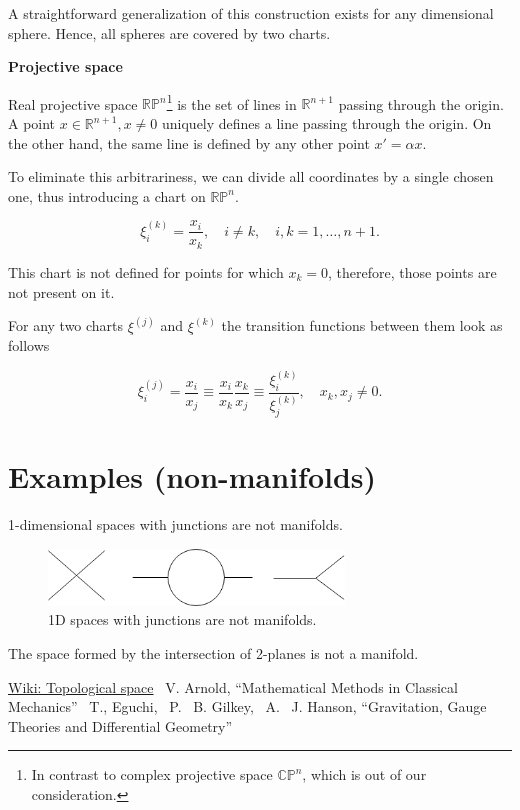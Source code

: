 \documentclass[a4paper,10pt]{article}
\begin{document}
A straightforward generalization of this construction exists for any dimensional sphere. Hence, all spheres are covered by two charts.
\newline

{\bf Projective space}
\newline

Real projective space $\mathbb{RP}^n$\footnote{ In contrast to complex projective space $\mathbb{CP}^n$, which is out of our consideration.  } is the set of lines in $\mathbb{R}^{n+1}$ passing through the origin. A point $x \in \mathbb{R}^{n+1}, x\neq 0$ uniquely defines a line passing through the origin. On the other hand, the same line is defined by any other point $x' = \alpha x$. 

To eliminate this arbitrariness, we can divide all coordinates by a single chosen one, thus introducing a chart on $\mathbb{RP}^n$.

\begin{equation}
\xi^{(k)}_i = \frac{x_i}{x_k},  \quad i\neq k, \quad i,k = 1, \ldots, n+1.
\end{equation}

This chart is not defined for points for which $x_k = 0$, therefore, those points are not present on it. 

For any two charts $\xi^{(j)}$ and $\xi^{(k)}$ the transition functions between them look as follows

\begin{equation}
 \xi^{(j)}_i = \frac{x_i}{x_j} \equiv \frac{x_i}{x_k}\frac{x_k}{x_j} \equiv \frac{\xi^{(k)}_i}{\xi^{(k)}_j}, \quad x_k, x_j\neq 0.
\end{equation}


\newpage
\section{Examples (non-manifolds)}

1-dimensional spaces with junctions are not manifolds.

\begin{figure}[h]
\centering
 \includegraphics[width=0.7\textwidth]{../../images/NonManifolds.png}
 \caption{ 1D spaces with junctions are not manifolds.}
 \label{fig:nm}
\end{figure}

The space formed by the intersection of 2-planes is not a manifold.

\begin{thebibliography}{1}
 \href{https://en.wikipedia.org/wiki/Topological_space}{Wiki: Topological space}
 ~V. Arnold, ``Mathematical Methods in Classical Mechanics''
 ~T., Eguchi, ~P. ~B. Gilkey, ~A. ~J. Hanson,  ``Gravitation, Gauge Theories and Differential Geometry''
\end{thebibliography}
\end{document}
